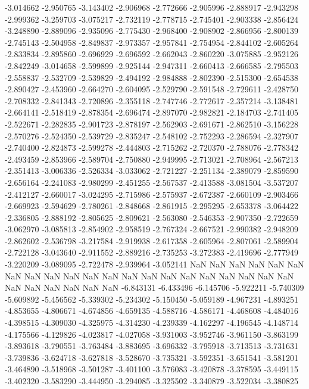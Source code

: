 -3.014662
-2.950765
-3.143402
-2.906968
-2.772666
-2.905996
-2.888917
-2.943298
-2.999362
-3.259703
-3.075217
-2.732119
-2.778715
-2.745401
-2.903338
-2.856424
-3.248890
-2.889096
-2.935096
-2.775430
-2.968400
-2.908902
-2.866956
-2.800139
-2.745143
-2.504958
-2.849837
-2.973357
-2.957841
-2.754954
-2.844102
-2.605264
-2.833834
-2.895860
-2.696929
-2.696592
-2.662043
-2.860220
-3.075885
-2.952126
-2.842249
-3.014658
-2.599899
-2.925144
-2.947311
-2.660413
-2.666585
-2.795503
-2.558837
-2.532709
-2.539829
-2.494192
-2.984888
-2.802390
-2.515300
-2.654538
-2.890427
-2.453960
-2.664270
-2.604095
-2.529790
-2.591548
-2.729611
-2.428750
-2.708332
-2.841343
-2.720896
-2.355118
-2.747746
-2.772617
-2.357214
-3.138481
-2.664141
-2.518419
-2.878354
-2.696474
-2.897070
-2.982821
-2.184703
-2.741405
-2.522671
-2.282835
-2.901723
-2.878197
-2.562903
-2.691671
-2.862510
-3.156228
-2.570276
-2.524350
-2.539729
-2.835247
-2.548102
-2.752293
-2.286594
-2.327907
-2.740400
-2.824873
-2.599278
-2.444803
-2.715262
-2.720370
-2.788076
-2.778342
-2.493459
-2.853966
-2.589704
-2.750880
-2.949995
-2.713021
-2.708964
-2.567213
-2.351413
-3.006336
-2.526334
-3.033062
-2.721227
-2.251134
-2.389079
-2.859590
-2.656164
-2.241083
-2.980299
-2.451255
-2.567537
-2.413588
-3.081504
-3.537207
-2.412127
-2.660017
-3.024295
-2.715986
-2.575937
-2.672387
-2.660109
-2.903466
-2.669923
-2.594629
-2.780261
-2.848668
-2.861915
-2.295295
-2.653378
-3.064422
-2.336805
-2.888192
-2.805625
-2.809621
-2.563080
-2.546353
-2.907350
-2.722659
-3.062970
-3.085813
-2.854902
-2.958519
-2.767324
-2.667521
-2.990382
-2.948209
-2.862602
-2.536798
-3.217584
-2.919938
-2.617358
-2.605964
-2.807061
-2.589904
-2.722128
-3.043640
-2.911552
-2.889216
-2.735253
-3.272383
-2.419696
-2.777949
-3.220209
-3.089095
-2.722478
-2.939964
-3.052141
NaN
NaN
NaN
NaN
NaN
NaN
NaN
NaN
NaN
NaN
NaN
NaN
NaN
NaN
NaN
NaN
NaN
NaN
NaN
NaN
NaN
NaN
NaN
NaN
NaN
NaN
NaN
-6.843131
-6.433496
-6.145706
-5.922211
-5.740309
-5.609892
-5.456562
-5.339302
-5.234302
-5.150450
-5.059189
-4.967231
-4.893251
-4.853655
-4.806671
-4.674856
-4.659135
-4.588716
-4.586171
-4.468608
-4.484016
-4.398515
-4.309030
-4.325975
-4.314230
-4.239339
-4.162297
-4.196545
-4.148714
-4.175566
-4.129826
-4.023817
-4.027058
-3.931003
-3.952746
-3.961150
-3.863199
-3.893618
-3.790551
-3.763484
-3.883695
-3.696332
-3.795918
-3.713513
-3.731631
-3.739836
-3.624718
-3.627818
-3.528670
-3.735321
-3.592351
-3.651541
-3.581201
-3.464890
-3.518968
-3.501287
-3.401100
-3.576083
-3.420878
-3.378595
-3.449115
-3.402320
-3.583290
-3.444950
-3.294085
-3.325502
-3.340879
-3.522034
-3.380825
